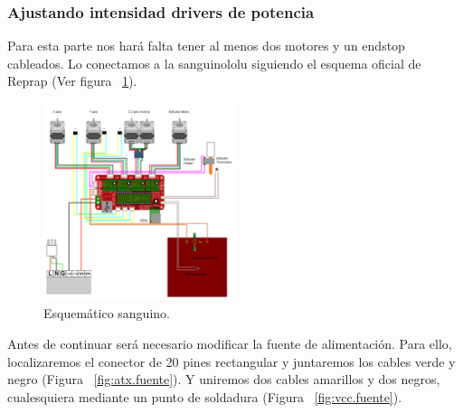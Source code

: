 		\subsubsection{Ajustando intensidad drivers de potencia}
		Para esta parte nos hará falta tener al menos dos motores y un endstop cableados. Lo conectamos a la sanguinololu siguiendo el esquema oficial de Reprap (Ver figura ~\ref{fig:esquema.sanguino}).\\
		\begin{figure}[H]
			\centering
			\includegraphics[width=0.5\textwidth]{../../Fotos/31.png}
			\caption{Esquemático sanguino.}
			\label{fig:esquema.sanguino}
		\end {figure}
Antes de continuar será necesario modificar la fuente de alimentación. Para ello, localizaremos el conector de 20 pines rectangular y juntaremos los cables verde y negro (Figura ~\ref{fig:atx.fuente}). Y uniremos dos cables amarillos y dos negros, cualesquiera mediante un punto de soldadura (Figura ~\ref{fig:vcc.fuente}).\\
